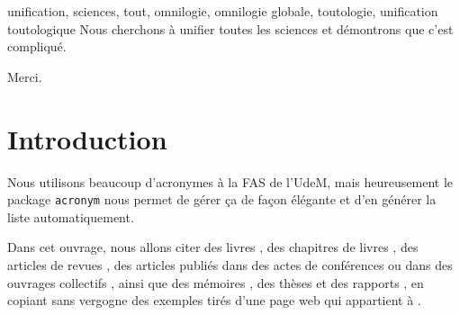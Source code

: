 \documentclass[phd]{dissertum}
\date{Août}{2023}
\begin{document}
  \pagetitre
  \pagejury

  \begin{resume}{unification, sciences, tout, omnilogie, omnilogie globale, toutologie, unification toutologique}
    Nous cherchons à unifier toutes les sciences et démontrons que c'est compliqué.
  \end{resume}

  \begin{abstract}{unification, sciences, everything, omniology, global omniology, holology, holological unification}
    We try to unify all sciences and demonstrate that it is complicated.
  \end{abstract}

  \matieres

    \begin{acronym}
    \end{acronym}


    Merci.

    \lipsum[1-2]


  \chapter{Introduction}
    Nous utilisons beaucoup d'acronymes à la \ac{FAS} de l'\ac{UdeM}, mais heureusement le package \texttt{acronym} nous permet de gérer ça de façon élégante et d'en générer la liste automatiquement.

    Dans cet ouvrage, nous allons citer des livres \citep{livre}, des chapitres de livres \citep{chapitre}, des articles de revues \citep{revue}, des articles publiés dans des actes de conférences \citep{actes} ou dans des ouvrages collectifs \citep{coll}, ainsi que des mémoires \citep{ma}, des thèses \citep{phd} et des rapports \citep{rapport}, en copiant sans vergogne des exemples tirés d'une page web qui appartient à \citet{web}.
\end{document}
